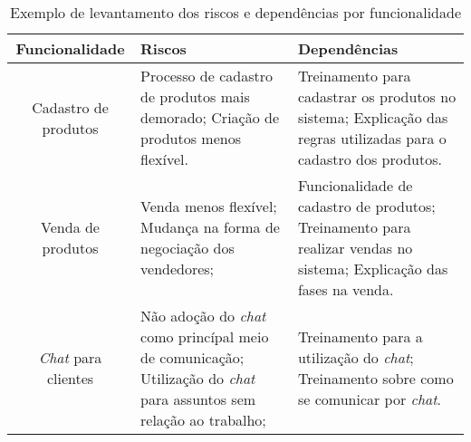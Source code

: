       \begin{table}[h!]
        \centering
        \begin{tabular}{|c|p{4cm}|p{6cm}|}
          \hline
          \textbf{Funcionalidade} &
          \textbf{Riscos}  &
          \textbf{Dependências}
          \\ \hline
          Cadastro de produtos &
          Processo de cadastro de produtos mais demorado; \newline
          Criação de produtos menos flexível. &
          Treinamento para cadastrar os produtos no sistema;\newline
          Explicação das regras utilizadas para o cadastro dos produtos.
          \\ \hline
          Venda de produtos &
          Venda menos flexível; \newline
          Mudança na forma de negociação dos vendedores; &
          Funcionalidade de cadastro de produtos; \newline
          Treinamento para realizar vendas no sistema; \newline
          Explicação das fases na venda.
          \\ \hline
          \textit{Chat} para clientes &
          Não adoção do \textit{chat} como princípal meio de comunicação; \newline
          Utilização do \textit{chat} para assuntos sem relação ao trabalho; &
          Treinamento para a utilização do \textit{chat}; \newline
          Treinamento sobre como se comunicar por \textit{chat}.
          \\ \hline
        \end{tabular}
        \caption{Exemplo de levantamento dos riscos e dependências por funcionalidade}
        \label{Tabela:3}
      \end{table}

